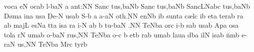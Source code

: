 \spatium
\sgn voc\punctum a\egn
\sgn {}e{}\punctum N\egn
\spatium
{}oc\pes ab\egn
\sgn l{\a}-\climacus baN\egn
\custos a\lineaproxima
a{nt:}\punctum N\augmentum N\egn
\spatium
\divisiofinalis
\spatium
\sgn Sa{nc}\holyScandicus\egn
\sgn tu{s,}\clivis ba\augmentumduplex Nb\egn
\spatium\divisiofinalis\spatium
\sgn Sa{nc}\holyScandicus\egn
\sgn tu{s,}\clivis ba\augmentumduplex Nb\egn
\spatium\divisiofinalis\spatium
\sgn Sa{nc}\pes LN\nonspatium\quilismascandicus abc\egn
\sgn tu{s,}\clivis ba\augmentumduplex Nb\egn
\spatium
\divisiominor
\spatium
\sgn D{\o}m\punctum a\egn
\sgn {}in\punctum a\egn
\sgn {}us\punctum a\egn
\spatium
\sgn De-\punctum N\egn
\sgn {}us\pes ab\egn
\spatium
\sgn S{\a}-\punctum b\egn
\custos a\lineaproxima
a-\clivis aN\egn
\sgn {}o{th.}\punctum N\augmentum N\egn
\spatium\divisiofinalis\spatium
{}en\pes Nb\egn
\sgn {}i{}\punctum b\egn
\spatium
\sgn su{nt}\punctum a\egn
\spatium
\sgn c{\ae}l\punctum c\egn
\sgn {}i{}\punctum b\egn
\spatium
\sgn {}et\punctum a\egn
\spatium
\sgn ter\pes ab\egn
\sgn ra{}%
\punctum a\augmentum b\egn
\spatium
\divisiominor
\spatium
\sgn maj\punctum L\egn
\sgn {}es\pes Na\egn
\sgn t{\a}t\punctum a\egn
\sgn {}is\punctum a\egn
\spatium
{}r\punctum a\egn
\sgn {}i-\punctum N\egn
\sgn {}{\ae}{}\pes ab\egn
\spatium\custos b\lineaproxima
\sgn tu-\climacus baN\egn
\sgn {}{\ae}.\punctum N\augmentum N\egn
\spatium
\divisiofinalis
\spatium
\sgn Te{}\torculus Nba\egn
\spatium
{}or\punctum c\egn
\sgn {}i-\punctum b\egn
\sgn {}{\o}s\pes ab\egn
\sgn {}us\punctum a\augmentum b\egn
\spatium\divisiominor\spatium
\sgn {}Ap\punctum a\egn
\sgn {}os\punctum a\egn
\sgn tol\punctum a\egn
\sgn {}{\o}r\punctum N\egn
\sgn {}um\pes ab\egn
\spatium
{}o-\climacus baN\egn
\sgn ru{s,}\punctum N\augmentum N\egn
\spatium
\divisiofinalis
\spatium
\sgn Te{}\torculus Nba\egn
\spatium
{}o-\engl{}\punctum c\egn
\custos b\lineaproxima
et\punctum b\egn
\sgn {}{\a}r\pes ab\egn
\sgn {}um\punctum a\augmentum b\egn
\spatium\divisiominor\spatium
\sgn lau\punctum a\egn
\sgn d{\a}b\punctum a\egn
\sgn {}il\punctum N\egn
\sgn {}is\pes ab\egn
\spatium
\sgn n{\u}m\punctum b\egn
\sgn {}e{-r}\clivis aN\egn
\sgn {}u{s,}\punctum N\augmentum N\egn
\spatium
\divisiofinalis
\spatium
\sgn Te{}\torculus Nba\egn
\spatium
\sgn M{\a}r\punctum c\egn
\sgn tyr\punctum b\egn
